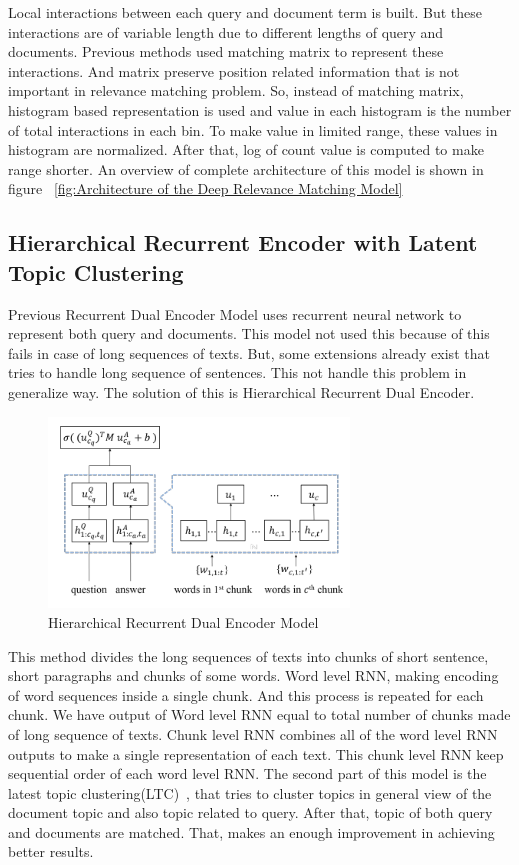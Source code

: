 \documentclass{doublecol-new}
\theoremstyle{TH}{
\newtheorem{lemma}{Lemma}
\newtheorem{theorem}[lemma]{Theorem}
\newtheorem{corrolary}[lemma]{Corrolary}
\newtheorem{conjecture}[lemma]{Conjecture}
\newtheorem{proposition}[lemma]{Proposition}
\newtheorem{claim}[lemma]{Claim}
\newtheorem{stheorem}[lemma]{Wrong Theorem}
\newtheorem{algorithm}{Algorithm}
}
\theoremstyle{THrm}{
\newtheorem{definition}{Definition}[section]
\newtheorem{question}{Question}[section]
\newtheorem{remark}{Remark}
\newtheorem{scheme}{Scheme}
}
\theoremstyle{THhit}{
\newtheorem{case}{Case}[section]
}
\begin{document}
 Local interactions between each query and document term is built. But these interactions are of variable length due to different lengths of query and documents. Previous methods used matching matrix to represent these interactions. And matrix preserve position related information that is not important in relevance matching problem. So, instead of matching matrix, histogram based representation is used and value in each histogram is the number of total interactions in each bin. To make value in limited range, these values in histogram are normalized. After that, log of count value is computed to make range shorter. An overview of complete architecture of this model is shown in figure ~\ref{fig:Architecture of the Deep Relevance Matching Model}
\subsection{Hierarchical Recurrent Encoder with Latent Topic Clustering}


Previous Recurrent Dual Encoder Model uses recurrent neural network to represent both query and documents. This model not used this because of this fails in case of long sequences of texts. But, some extensions already exist that tries to handle long sequence of sentences. This not handle this problem in generalize way. The solution of this is Hierarchical Recurrent Dual Encoder. 
\begin{figure}[h]
	\centerline{\includegraphics[width=8cm,keepaspectratio]{image/HRDE.PNG}}
	\caption{Hierarchical Recurrent Dual Encoder Model}
	\label{HRDE model}
\end{figure}
This method divides the long sequences of texts into chunks of short sentence, short paragraphs and chunks of some words. Word level RNN, making encoding of word sequences inside a single chunk. And this process is repeated for each chunk. We have output of Word level RNN equal to total number of chunks made of long sequence of texts. Chunk level RNN combines all of the word level RNN outputs to make a single representation of each text. This chunk level RNN keep sequential order of each word level RNN. The second part of this model is the latest topic clustering(LTC)~\cite{yoon2017learning}, that tries to cluster topics in general view of the document topic and also topic related to query. After that, topic of both query and documents are matched. That, makes an enough improvement in achieving better results. 
\end{document}
